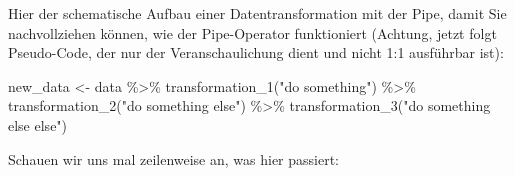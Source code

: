 \documentclass[
]{book}
\newenvironment{Shaded}{\begin{snugshade}}{\end{snugshade}}
\newcommand{\FunctionTok}[1]{\textcolor[rgb]{0.00,0.00,0.00}{#1}}
\newcommand{\NormalTok}[1]{#1}
\newcommand{\OtherTok}[1]{\textcolor[rgb]{0.56,0.35,0.01}{#1}}
\newcommand{\SpecialCharTok}[1]{\textcolor[rgb]{0.00,0.00,0.00}{#1}}
\newcommand{\StringTok}[1]{\textcolor[rgb]{0.31,0.60,0.02}{#1}}
\begin{document}
Hier der schematische Aufbau einer Datentransformation mit der Pipe, damit Sie nachvollziehen können, wie der Pipe-Operator funktioniert (Achtung, jetzt folgt Pseudo-Code, der nur der Veranschaulichung dient und nicht 1:1 ausführbar ist):

\begin{Shaded}
\begin{Highlighting}[]
\NormalTok{new\_data }\OtherTok{\textless{}{-}}\NormalTok{ data }\SpecialCharTok{\%\textgreater{}\%} 
  \FunctionTok{transformation\_1}\NormalTok{(}\StringTok{"do something"}\NormalTok{) }\SpecialCharTok{\%\textgreater{}\%}
  \FunctionTok{transformation\_2}\NormalTok{(}\StringTok{"do something else"}\NormalTok{) }\SpecialCharTok{\%\textgreater{}\%}
  \FunctionTok{transformation\_3}\NormalTok{(}\StringTok{"do something else else"}\NormalTok{) }
\end{Highlighting}
\end{Shaded}

Schauen wir uns mal zeilenweise an, was hier passiert:
\end{document}
